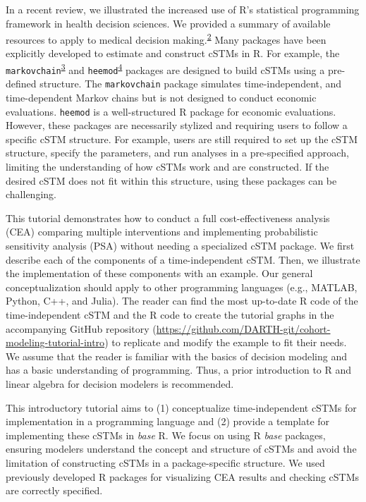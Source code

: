\documentclass[
]{article}
\begin{document}
In a recent review, we illustrated the increased use of R's statistical programming framework in health decision sciences. We provided a summary of available resources to apply to medical decision making.\textsuperscript{\protect\hyperlink{ref-Jalal2017b}{2}} Many packages have been explicitly developed to estimate and construct cSTMs in R. For example, the \texttt{markovchain}\textsuperscript{\protect\hyperlink{ref-Spedicato2017}{3}} and \texttt{heemod}\textsuperscript{\protect\hyperlink{ref-Filipovic-Pierucci2017}{4}} packages are designed to build cSTMs using a pre-defined structure. The \texttt{markovchain} package simulates time-independent, and time-dependent Markov chains but is not designed to conduct economic evaluations. \texttt{heemod} is a well-structured R package for economic evaluations. However, these packages are necessarily stylized and requiring users to follow a specific cSTM structure. For example, users are still required to set up the cSTM structure, specify the parameters, and run analyses in a pre-specified approach, limiting the understanding of how cSTMs work and are constructed. If the desired cSTM does not fit within this structure, using these packages can be challenging.

This tutorial demonstrates how to conduct a full cost-effectiveness analysis (CEA) comparing multiple interventions and implementing probabilistic sensitivity analysis (PSA) without needing a specialized cSTM package. We first describe each of the components of a time-independent cSTM. Then, we illustrate the implementation of these components with an example. Our general conceptualization should apply to other programming languages (e.g., MATLAB, Python, C++, and Julia). The reader can find the most up-to-date R code of the time-independent cSTM and the R code to create the tutorial graphs in the accompanying GitHub repository (\url{https://github.com/DARTH-git/cohort-modeling-tutorial-intro}) to replicate and modify the example to fit their needs. We assume that the reader is familiar with the basics of decision modeling and has a basic understanding of programming. Thus, a prior introduction to R and linear algebra for decision modelers is recommended.

This introductory tutorial aims to (1) conceptualize time-independent cSTMs for implementation in a programming language and (2) provide a template for implementing these cSTMs in \emph{base} R. We focus on using R \emph{base} packages, ensuring modelers understand the concept and structure of cSTMs and avoid the limitation of constructing cSTMs in a package-specific structure. We used previously developed R packages for visualizing CEA results and checking cSTMs are correctly specified.
\end{document}
